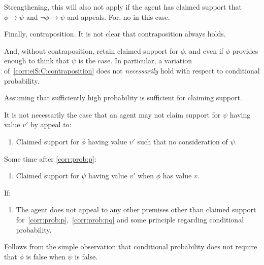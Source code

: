 \begin{note}
  Strengthening, this will also not apply if the agent has claimed support that \(\phi \rightarrow \psi\) and \(\lnot \phi \rightarrow \psi\) and appeals.
  For, no \requ{} in this case.
\end{note}

\begin{note}
  Finally, contraposition.
  It is not clear that contraposition always holds.

  And, without contraposition, retain claimed support for \(\phi\), and even if \mom{} \(\phi\) provides enough to think that \(\psi\) is the case.
  In particular, a variation of~\ref{corr:eiS:C:contraposition} does not \emph{necessarily} hold with respect to conditional probability.

  \begin{idea}\label{conj:eiS:C:probability}
    Assuming that sufficiently high probability is sufficient for claiming support.

    It is not necessarily the case that an agent may not claim support for \(\psi\) having value \(v'\) by appeal to:
    \begin{enumerate}[label=\arabic*., ref=(\arabic*)]
    \item\label{corr:prob:p} Claimed support for \(\phi\) having value \(v'\) such that no consideration of \(\psi\).
    \end{enumerate}

    Some time after \ref{corr:prob:p}:

    \begin{enumerate}[label=\arabic*., ref=(\arabic*), resume]
  \item\label{corr:prob:pq} Claimed support for \(\psi\) having value \(v'\) when \(\phi\) has value \(v\).
    \end{enumerate}

    If:
    \begin{enumerate}[label=\arabic*., ref=(\arabic*), resume]
    \item The agent does not appeal to any other premises other than claimed support for~\ref{corr:prob:p},~\ref{corr:prob:pq} and some principle regarding conditional probability.
    \end{enumerate}
    \vspace{-\baselineskip}
  \end{idea}

  Follows from the simple observation that conditional probability does not require that \(\phi\) is false when \(\psi\) is false.


\end{note}

